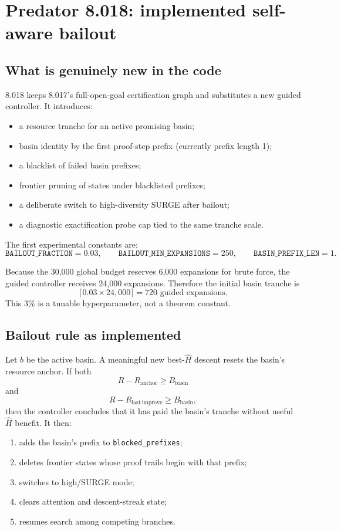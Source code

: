 \documentclass[11pt]{article}
\newcommand{\code}[1]{\texttt{#1}}
\begin{document}
\section{Predator 8.018: implemented self-aware bailout}

\subsection{What is genuinely new in the code}

8.018 keeps 8.017's full-open-goal certification graph and substitutes a new guided controller. It introduces:
\begin{itemize}
\item a resource tranche for an active promising basin;
\item basin identity by the first proof-step prefix (currently prefix length 1);
\item a blacklist of failed basin prefixes;
\item frontier pruning of states under blacklisted prefixes;
\item a deliberate switch to high-diversity SURGE after bailout;
\item a diagnostic exactification probe cap tied to the same tranche scale.
\end{itemize}

The first experimental constants are:
\[
\texttt{BAILOUT\_FRACTION}=0.03,\qquad
\texttt{BAILOUT\_MIN\_EXPANSIONS}=250,\qquad
\texttt{BASIN\_PREFIX\_LEN}=1.
\]

Because the 30,000 global budget reserves 6,000 expansions for brute force, the guided controller receives 24,000 expansions. Therefore the initial basin tranche is
\[
\boxed{\lceil0.03\times24{,}000\rceil=720\text{ guided expansions}.}
\]
This 3\% is a tunable hyperparameter, not a theorem constant.

\subsection{Bailout rule as implemented}

Let $b$ be the active basin. A meaningful new best-$\widehat H$ descent resets the basin's resource anchor. If both
\[
R-R_{\mathrm{anchor}}\ge B_{\mathrm{basin}}
\]
and
\[
R-R_{\mathrm{last\ improve}}\ge B_{\mathrm{basin}},
\]
then the controller concludes that it has paid the basin's tranche without useful $\widehat H$ benefit. It then:
\begin{enumerate}
\item adds the basin's prefix to \code{blocked\_prefixes};
\item deletes frontier states whose proof trails begin with that prefix;
\item switches to high/SURGE mode;
\item clears attention and descent-streak state;
\item resumes search among competing branches.
\end{enumerate}
\end{document}
